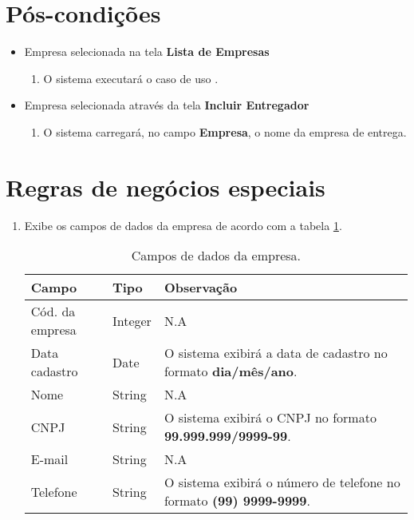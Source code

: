 \section{Pós-condições}

\begin{itemize}
	\item Empresa selecionada na tela \textbf{Lista de Empresas}
	\begin{enumerate}
		\item O sistema executará o caso de uso .	
	\end{enumerate}

	\item Empresa selecionada através da tela \textbf{Incluir Entregador}
	\begin{enumerate}
		\item O sistema carregará, no campo \textbf{Empresa}, o nome da empresa de entrega. 
	\end{enumerate}
\end{itemize}

\section{Regras de negócios especiais}

\begin{enumerate}[label=ED\arabic*]
	\item Exibe os campos de dados da empresa de acordo com a tabela \ref{uc011_tb_rn1}. \label{uc011_rn:1}
	\begin{table}[htb]
		\ABNTEXfontereduzida
		\caption[Campos de dados da empresa]{Campos de dados da empresa.}
		\label{uc011_tb_rn1}
		\begin{tabular}{|p{4.0cm}|p{3.0cm}|p{7.25cm}|}
			\hline
			\textbf{Campo}  & \textbf{Tipo} & \textbf{Observação}                                                        \\ \hline
			Cód. da empresa & Integer       & N.A                                                                        \\ \hline
			Data cadastro   & Date          & O sistema exibirá a data de cadastro no formato \textbf{dia/mês/ano}.      \\ \hline
			Nome            & String        & N.A                                                                        \\ \hline
			CNPJ            & String        & O sistema exibirá o CNPJ no formato \textbf{99.999.999/9999-99}.           \\ \hline
			E-mail          & String        & N.A                                                                        \\ \hline
			Telefone        & String        & O sistema exibirá o número de telefone no formato \textbf{(99) 9999-9999}. \\ \hline			
		\end{tabular}
	\end{table}
\end{enumerate}